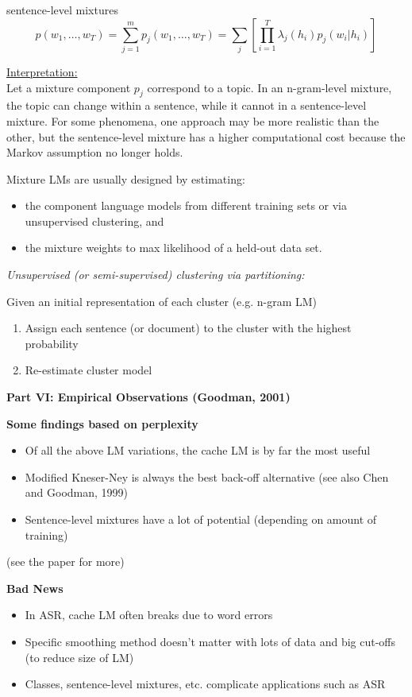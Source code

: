 \documentclass[11pt,titlepage]{article}
\begin{document}
sentence-level mixtures
$$p(w_1, \ldots , w_T) = \sum_{j=1}^m p_j(w_1, \ldots , w_T) 
 = \sum_j \left[ \prod_{i=1}^T \lambda_j(h_i) p_j(w_i|h_i) \right]$$

\underline{Interpretation:}\\
Let a mixture component $p_j$ correspond to a topic.  In an
n-gram-level mixture, the topic can change within a sentence, while it
cannot in a sentence-level mixture. For some phenomena, one approach
may be more realistic than the other, but the sentence-level mixture
has a higher computational cost because the Markov assumption no
longer holds.

\clearpage

Mixture LMs are usually designed by estimating:
\begin{itemize}
\item the component language models from different training sets or via
unsupervised clustering, and 
\item the mixture weights to max likelihood of a held-out data set. 
\end{itemize}

\vskip 0.3in

{\sl Unsupervised (or semi-supervised) clustering via partitioning:}

Given an initial representation of each cluster (e.g. n-gram LM)
\begin{enumerate}
\item Assign each sentence (or document) to the cluster with the highest probability
\item Re-estimate cluster model
\end{enumerate}


\clearpage 

\centerline{{\huge \bf Part VI: Empirical Observations (Goodman, 2001)}}
\vskip 0.2in

{\bf Some findings based on perplexity}
\begin{itemize}
\item Of all the above LM variations, the cache LM is by far the most useful
\item Modified Kneser-Ney is always the best back-off alternative (see
also Chen and Goodman, 1999) 
\item Sentence-level mixtures have a lot of potential (depending on
amount of training)
\end{itemize}
(see the paper for more)
\vskip 0.3in

{\bf Bad News}
\begin{itemize}
\item In ASR, cache LM often breaks due to word errors
\item Specific smoothing method doesn't matter with lots of data and big cut-offs (to reduce size of LM) 
\item Classes, sentence-level mixtures, etc. complicate applications such as ASR
\end{itemize}
\end{document}
